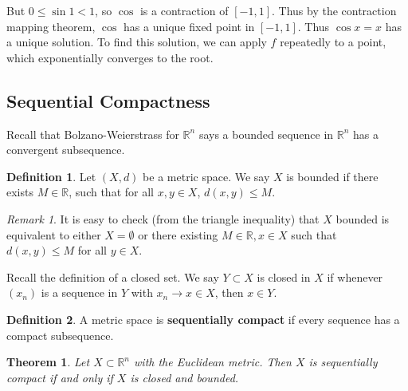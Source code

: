 \documentclass[12pt]{article}
\newtheorem{theorem}{Theorem}[section]
\theoremstyle{definition}
\newtheorem{definition}{Definition}[section]
\theoremstyle{remark}
\newtheorem*{remark}{Remark}
\begin{document}
\begin{adjustbox}{minipage = \columnwidth - 25.5pt, margin=1em, frame=1pt, margin=0em}
	But $0 \leq \sin 1 < 1$, so $\cos$ is a contraction of $[-1, 1]$. Thus by the contraction mapping theorem, $\cos$ has a unique fixed point in $[-1, 1]$. Thus $\cos x = x$ has a unique solution. To find this solution, we can apply $f$ repeatedly to a point, which exponentially converges to the root.
\end{adjustbox}

\subsection{Sequential Compactness}%
\label{sub:sequential_compactness}

Recall that Bolzano-Weierstrass for $\mathbb{R}^{n}$ says a bounded sequence in $\mathbb{R}^{n}$ has a convergent subsequence.

\begin{definition}
	Let $(X, d)$ be a metric space. We say $X$ is bounded if there exists $M \in \mathbb{R}$, such that for all $x, y \in X$, $d(x, y) \leq M$.
\end{definition}

\begin{remark}
	It is easy to check (from the triangle inequality) that $X$ bounded is equivalent to either $X = \emptyset$ or there existing $M \in \mathbb{R}, x \in X$ such that $d(x, y) \leq M$ for all $y \in X$.
\end{remark}

Recall the definition of a closed set. We say $Y \subset X$ is closed in $X$ if whenever $(x_n)$ is a sequence in $Y$ with $x_n \to x \in X$, then $x \in Y$.

\begin{definition}
	A metric space is \textbf{sequentially compact} if every sequence has a compact subsequence.
\end{definition}

\begin{theorem}
	Let $X \subset \mathbb{R}^{n}$ with the Euclidean metric. Then $X$ is sequentially compact if and only if $X$ is closed and bounded.
\end{theorem}
\end{document}
